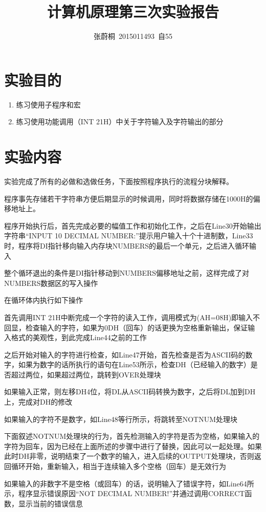 \documentclass[UTF8,a4paper]{ctexart}
\title{计算机原理第三次实验报告}
\author{张蔚桐\ 2015011493\ 自55}
\begin{document}
\maketitle
\section{实验目的}
\begin{enumerate}
\item 练习使用子程序和宏
\item 练习使用功能调用（INT 21H）中关于字符输入及字符输出的部分
\end{enumerate}
\section{实验内容}
实验完成了所有的必做和选做任务，下面按照程序执行的流程分块解释。

程序事先存储若干字符串方便后期显示的时候调用，同时将数据存储在1000H的偏移地址上。

程序开始执行后，首先完成必要的幅值工作和初始化工作，之后在Line30开始输出字符串“INPUT 10 DECIMAL NUMBER:”提示用户输入十个十进制数，Line33时，程序将DI指针移向输入内存块NUMBERS的最后一个单元，之后进入循环输入

整个循环退出的条件是DI指针移动到NUMBERS偏移地址之前，这样完成了对NUMBERS数据区的写入操作

在循环体内执行如下操作

首先调用INT 21H中断完成一个字符的读入工作，调用模式为(AH=08H)即输入不回显，检查输入的字符，如果为0DH（回车）的话更换为空格重新输出，保证输入格式的美观性，到此完成Line44之前的工作

之后开始对输入的字符进行检查，如Line47开始，首先检查是否为ASCII码的数字，如果为数字的话所执行的语句在Line53所示，检查DH（已经输入的数字）是否超过两位，如果超过两位，跳转到OVER处理块

如果输入正常，则左移DH4位，将DL从ASCII码转换为数字，之后将DL加到DH上，完成对DH的修改

如果输入的字符不是数字，如Line48等行所示，将跳转至NOTNUM处理块

下面叙述NOTNUM处理块的行为，首先检测输入的字符是否为空格，如果输入的字符为回车，因为已经在上面所述的步骤中进行了替换，因此可以一起处理。如果此时DH非零，说明结束了一个数字的输入，进入后续的OUTPUT处理块，否则返回循环开始，重新输入，相当于连续输入多个空格（回车）是无效行为

如果输入的非数字不是空格（或回车）的话，说明输入了错误字符，如Line64所示，程序显示错误原因“NOT DECIMAL NUMBER!”并通过调用CORRECT函数，显示当前的错误信息
\end{document}
